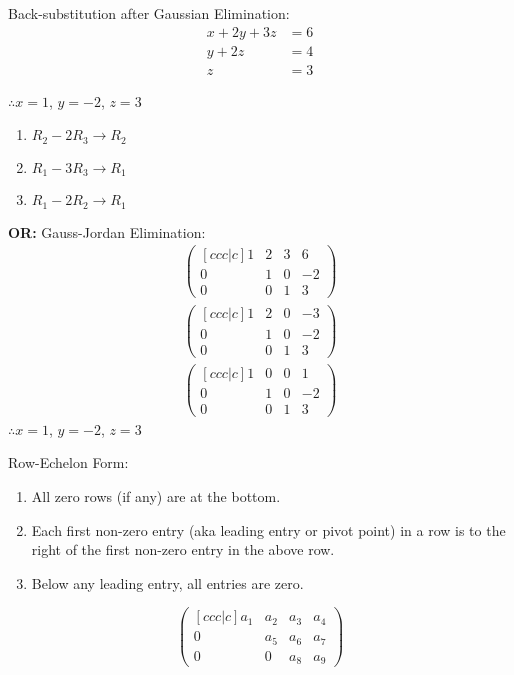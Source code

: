 \noindent
\newline
Back-substitution after Gaussian Elimination:
\begin{align}
    x + 2y + 3z &= 6 \\
    y + 2z &= 4 \\
    z &= 3
\end{align}

\noindent
\(\therefore x=1\), \(y=-2\), \(z = 3\)

\begin{enumerate}
    \item \(R_2 - 2R_3 \rightarrow R_2\)
    \item \(R_1 - 3R_3 \rightarrow R_1\)
    \item \(R_1 - 2R_2 \rightarrow R_1\)
\end{enumerate}

\noindent
\newline
\textbf{OR:} Gauss-Jordan Elimination:
\begin{align}
    \begin{pmatrix}[ccc|c]
      1 & 2 & 3 & 6 \\
      0 & 1 & 0 & -2 \\
      0 & 0 & 1 & 3
    \end{pmatrix} \\
    \begin{pmatrix}[ccc|c]
      1 & 2 & 0 & -3 \\
      0 & 1 & 0 & -2 \\
      0 & 0 & 1 & 3
    \end{pmatrix} \\
    \begin{pmatrix}[ccc|c]
      1 & 0 & 0 & 1 \\
      0 & 1 & 0 & -2 \\
      0 & 0 & 1 & 3
    \end{pmatrix}
\end{align}
\newline
\noindent
\(\therefore x=1\), \(y=-2\), \(z = 3\)

\begin{definition}
    Row-Echelon Form:
    \begin{enumerate}
        \item All zero rows (if any) are at the bottom.
        \item Each first non-zero entry (aka leading entry or pivot point) in a row is to the right of the first non-zero entry in the above row.
        \item Below any leading entry, all entries are zero.
    \end{enumerate}
    \[
        \begin{pmatrix}[ccc|c]
            a_1 & a_2 & a_3 & a_4 \\
            0 & a_5 & a_6 & a_7 \\
            0 & 0 & a_8 & a_9
        \end{pmatrix}
    \]
\end{definition}

